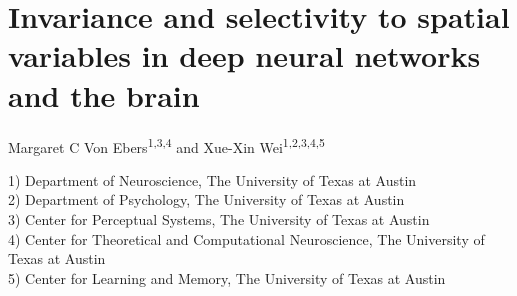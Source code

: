 \documentclass[11pt]{article}
\begin{document}

\section*{\LARGE  Invariance and selectivity to spatial variables in deep neural networks and the brain }


Margaret C Von Ebers\textsuperscript{1,3,4} and Xue-Xin Wei\textsuperscript{1,2,3,4,5}


1) Department of Neuroscience, The University of Texas at Austin\\
2) Department of Psychology, The University of Texas at Austin\\
3) Center for Perceptual Systems, The University of Texas at Austin\\
4) Center for Theoretical and Computational Neuroscience, The University of Texas at Austin\\
5) Center for Learning and Memory, The University of Texas at Austin
\end{document}
